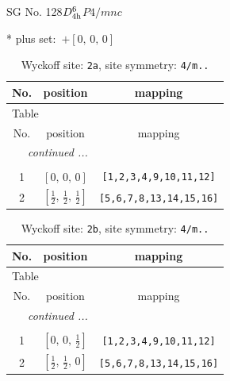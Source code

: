 \documentclass[fleqn,8pt]{jsarticle}
\begin{document}
\setcounter{MaxMatrixCols}{32}

\renewcommand{\tablename}{Table~}
\renewcommand{\figurename}{Figure~}
\begin{center}
\LARGE
SG No. 128\quad$D_{\rm 4h}^{6}$\quad$P4/mnc$\quad[ tetragonal ]
\end{center}
* plus set:\,\,\,$+\left[ 0,\, 0,\, 0 \right]$
\renewcommand{\arraystretch}{1.2}
\begin{longtable}{ccc}
\caption{Wyckoff site: {\tt 2a}, site symmetry: {\tt 4/m..}}
 \\
 \hline \hline
No. & position & mapping \\ \hline \endfirsthead

\multicolumn{2}{l}{\tablename\ \thetable{}} \\
 \hline \hline
No. & position & mapping \\ \hline \endhead

 \hline \hline
\multicolumn{2}{r}{\footnotesize\it continued ...} \\ \endfoot

 \hline \hline
\multicolumn{2}{r}{} \\ \endlastfoot

1 & $\left[ 0,\, 0,\, 0 \right]$ & {\tt [1,2,3,4,9,10,11,12]} \\ \hline
2 & $\left[ \frac{1}{2},\, \frac{1}{2},\, \frac{1}{2} \right]$ & {\tt [5,6,7,8,13,14,15,16]} \\
\end{longtable}
\renewcommand{\arraystretch}{1.2}
\begin{longtable}{ccc}
\caption{Wyckoff site: {\tt 2b}, site symmetry: {\tt 4/m..}}
 \\
 \hline \hline
No. & position & mapping \\ \hline \endfirsthead

\multicolumn{2}{l}{\tablename\ \thetable{}} \\
 \hline \hline
No. & position & mapping \\ \hline \endhead

 \hline \hline
\multicolumn{2}{r}{\footnotesize\it continued ...} \\ \endfoot

 \hline \hline
\multicolumn{2}{r}{} \\ \endlastfoot

1 & $\left[ 0,\, 0,\, \frac{1}{2} \right]$ & {\tt [1,2,3,4,9,10,11,12]} \\ \hline
2 & $\left[ \frac{1}{2},\, \frac{1}{2},\, 0 \right]$ & {\tt [5,6,7,8,13,14,15,16]} \\
\end{longtable}
\end{document}
